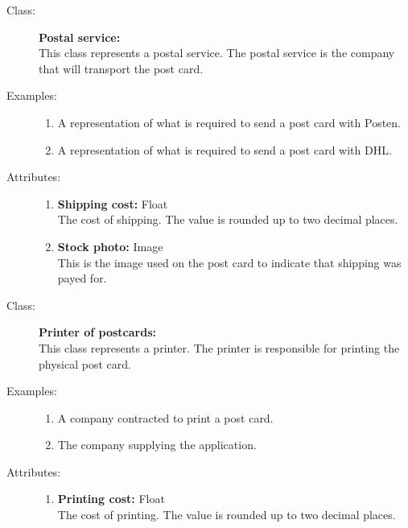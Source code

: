 \documentclass[10pt,a4paper]{article}
\begin{document}
\hrulefill

\begin{description}
\item[Class:] \textbf{Postal service:} \hfill \\
This class represents a postal service. The postal service is the company that will transport the post card. 

\item[Examples:] \hfill
\begin{enumerate}
\item A representation of what is required to send a post card with Posten.
\item A representation of what is required to send a post card with DHL.
\end{enumerate}

\item[Attributes:] \hfill
\begin{enumerate}
\item \textbf{Shipping cost:} Float \hfill \\The cost of shipping. The value is rounded up to two decimal places.
\item \textbf{Stock photo:} Image \hfill \\This is the image used on the post card to indicate that shipping was payed for.
\end{enumerate}
\end{description}

\hrulefill

\begin{description}
\item[Class:] \textbf{Printer of postcards:} \hfill \\
This class represents a printer. The printer is responsible for printing the physical post card. 

\item[Examples:] \hfill
\begin{enumerate}
\item A company contracted to print a post card.
\item The company supplying the application.
\end{enumerate}

\item[Attributes:] \hfill
\begin{enumerate}
\item \textbf{Printing cost:} Float \hfill \\The cost of printing. The value is rounded up to two decimal places.
\end{enumerate}
\end{description}
\end{document}
